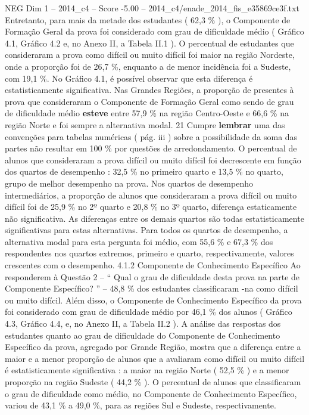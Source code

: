 \begin{textsample}{NEG Dim 1 – 2014\_c4 – Score -5.00 – 2014\_c4/enade\_2014\_fis\_e35869ce3f.txt}
Entretanto, para mais da metade dos estudantes ( 62,3 \% ), o Componente de Formação Geral da prova foi considerado com grau de dificuldade médio ( Gráfico 4.1, Gráfico 4.2 e, no Anexo II, a Tabela II.1 ).
O percentual de estudantes que consideraram a prova como difícil ou muito difícil foi maior na região Nordeste, onde a proporção foi de 26,7 \%, enquanto a de menor incidência foi a Sudeste, com 19,1 \%.
No Gráfico 4.1, é possível observar que esta diferença é estatisticamente significativa.
Nas Grandes Regiões, a proporção de presentes à prova que consideraram o Componente de Formação Geral como sendo de grau de dificuldade médio \textbf{esteve} entre 57,9 \% na região Centro-Oeste e 66,6 \% na região Norte e foi sempre a alternativa modal. 21 Cumpre \textbf{lembrar} uma das convenções para tabelas numéricas ( pág. iii ) sobre a possibilidade da soma das partes não resultar em 100 \% por questões de arredondamento.
O percentual de alunos que consideraram a prova difícil ou muito difícil foi decrescente em função dos quartos de desempenho : 32,5 \% no primeiro quarto e 13,5 \% no quarto, grupo de melhor desempenho na prova.
Nos quartos de desempenho intermediários, a proporção de alunos que consideraram a prova difícil ou muito difícil foi de 25,9 \% no 2º quarto e 20,8 \% no 3º quarto, diferença estaticamente não significativa.
As diferenças entre os demais quartos são todas estatisticamente significativas para estas alternativas.
Para todos os quartos de desempenho, a alternativa modal para esta pergunta foi médio, com 55,6 \% e 67,3 \% dos respondentes nos quartos extremos, primeiro e quarto, respectivamente, valores crescentes com o desempenho. 4.1.2 Componente de Conhecimento Específico Ao responderem à Questão 2 – “ Qual o grau de dificuldade desta prova na parte de Componente Específico? ” – 48,8 \% dos estudantes classificaram -na como difícil ou muito difícil.
Além disso, o Componente de Conhecimento Específico da prova foi considerado com grau de dificuldade médio por 46,1 \% dos alunos ( Gráfico 4.3, Gráfico 4.4, e, no Anexo II, a Tabela II.2 ).
A análise das respostas dos estudantes quanto ao grau de dificuldade do Componente de Conhecimento Específico da prova, agregado por Grande Região, mostra que a diferença entre a maior e a menor proporção de alunos que a avaliaram como difícil ou muito difícil é estatisticamente significativa : a maior na região Norte ( 52,5 \% ) e a menor proporção na região Sudeste ( 44,2 \% ).
O percentual de alunos que classificaram o grau de dificuldade como médio, no Componente de Conhecimento Específico, variou de 43,1 \% a 49,0 \%, para as regiões Sul e Sudeste, respectivamente.

\end{textsample}
